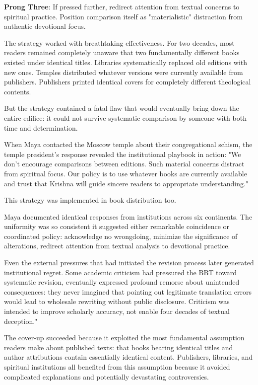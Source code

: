 \documentclass[12pt,twoside]{book}
\begin{document}
\textbf{\textbf{Prong Three}}: If pressed further, redirect attention from textual concerns to spiritual practice. Position comparison itself as "materialistic" distraction from authentic devotional focus.

The strategy worked with breathtaking effectiveness. For two decades, most readers remained completely unaware that two fundamentally different books existed under identical titles. Libraries systematically replaced old editions with new ones. Temples distributed whatever versions were currently available from publishers. Publishers printed identical covers for completely different theological contents.

But the strategy contained a fatal flaw that would eventually bring down the entire edifice: it could not survive systematic comparison by someone with both time and determination.

When Maya contacted the Moscow temple about their congregational schism, the temple president's response revealed the institutional playbook in action: "We don't encourage comparisons between editions. Such material concerns distract from spiritual focus. Our policy is to use whatever books are currently available and trust that Krishna will guide sincere readers to appropriate understanding."

This strategy was implemented in book distribution too.

Maya documented identical responses from institutions across six continents. The uniformity was so consistent it suggested either remarkable coincidence or coordinated policy: acknowledge no wrongdoing, minimize the significance of alterations, redirect attention from textual analysis to devotional practice.

Even the external pressures that had initiated the revision process later generated institutional regret. Some academic criticism had pressured the BBT toward systematic revision, eventually expressed profound remorse about unintended consequences: they never imagined that pointing out legitimate translation errors would lead to wholesale rewriting without public disclosure. Criticism was intended to improve scholarly accuracy, not enable four decades of textual deception."

The cover-up succeeded because it exploited the most fundamental assumption readers make about published texts: that books bearing identical titles and author attributions contain essentially identical content. Publishers, libraries, and spiritual institutions all benefited from this assumption because it avoided complicated explanations and potentially devastating controversies.
\end{document}
